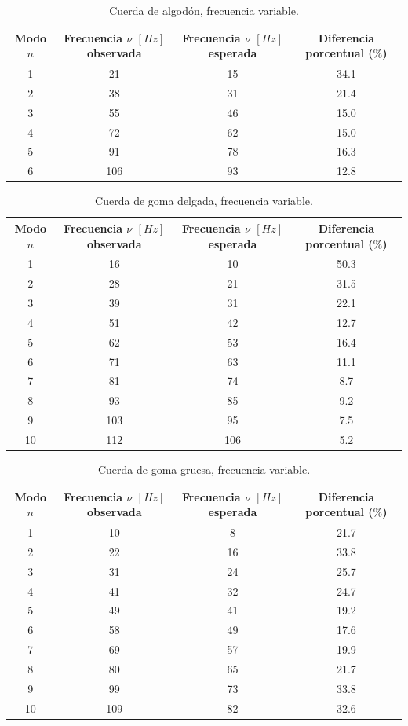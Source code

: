 \begin{table}[htbp]
    \centering
    \begin{tabular}{c|c|c|c}
        Modo $n$ & Frecuencia $\nu$ $[Hz]$ observada & Frecuencia $\nu$ $[Hz]$ esperada & Diferencia porcentual ($\%$) \\
        \hline
        1 & 21 & 15   & 34.1\\
        2 & 38 & 31 & 21.4\\
        3 & 55 & 46 & 15.0\\
        4 & 72 & 62 & 15.0\\
        5 & 91 & 78 & 16.3\\
        6 & 106 & 93 & 12.8
    \end{tabular}
    \caption{Cuerda de algodón, frecuencia variable.}
    \label{tab:frecuencia1}
\end{table}

\begin{table}[htbp]
    \centering
    \begin{tabular}{c|c|c|c}
        Modo $n$ & Frecuencia $\nu$ $[Hz]$ observada & Frecuencia $\nu$ $[Hz]$ esperada & Diferencia porcentual ($\%$) \\
        \hline
        1 & 16 & 10 & 50.3\\
        2 & 28 & 21 & 31.5\\
        3 & 39 & 31 & 22.1\\
        4 & 51 & 42 & 12.7\\
        5 & 62 & 53 & 16.4\\
        6 & 71 & 63 & 11.1\\
        7 & 81 & 74 & 8.7\\
        8 & 93 & 85 & 9.2\\
        9 & 103 & 95 & 7.5\\
        10 & 112 & 106 & 5.2
    \end{tabular}
    \caption{Cuerda de goma delgada, frecuencia variable.}
    \label{tab:frecuencia2}
\end{table}

\begin{table}[htbp]
    \centering
    \begin{tabular}{c|c|c|c}
        Modo $n$ & Frecuencia $\nu$ $[Hz]$ observada & Frecuencia $\nu$ $[Hz]$ esperada & Diferencia porcentual ($\%$) \\
        \hline
        1 & 10 & 8 & 21.7\\
        2 & 22 & 16 & 33.8\\
        3 & 31 & 24 & 25.7\\
        4 & 41 & 32 & 24.7\\
        5 & 49 & 41 & 19.2\\
        6 & 58 & 49 & 17.6\\
        7 & 69 & 57 & 19.9\\
        8 & 80 & 65 & 21.7\\
        9 & 99 & 73 & 33.8\\
        10 & 109 & 82 & 32.6
    \end{tabular}
    \caption{Cuerda de goma gruesa, frecuencia variable.}
    \label{tab:frecuencia3}
\end{table}


